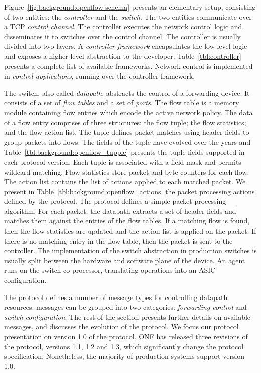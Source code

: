 Figure~\ref{fig:background:openflow-schema} presents an elementary \of setup,
consisting of two entities: the \textit{controller} and the \textit{switch}.
The two entities communicate over a TCP \textit{control channel}.  The \of
controller executes the network control logic and disseminates it to switches
over the control channel. The controller is usually divided into two layers. A
\textit{controller framework} encapsulates the low level \of logic and exposes
a higher level abstraction to the developer.  Table~\ref{tbl:controller}
presents a complete list of available \of frameworks.  Network control is
implemented in \textit{control applications}, running over the controller
framework. 


The \of switch, also called \textit{datapath}, abstracts the control of a
forwarding device. It consists of a set of \textit{flow tables}
and a set of \textit{ports}. The flow table is a memory module containing flow
entries which encode the active network policy. The data of a flow entry comprises of
three structures: the flow tuple; the flow statistics; and the flow
action list.  The tuple defines packet matches using header fields to group packets into
flows.  The fields of the tuple have evolved over the years and
Table~\ref{tbl:background:openflow_tupple} presents the tuple fields
supported in each protocol version. Each tuple is associated with a field mask and permits
wildcard matching.  Flow statistics store packet and byte counters for each
flow. The action list contains the list of actions applied to each matched
packet.  We present in Table~\ref{tbl:background:openflow_actions} the packet
processing actions defined by the \of protocol.  The protocol defines a simple
packet processing algorithm.  For each packet, the datapath extracts a set
of header fields and matches them against the entries of the flow tables.  If a
matching flow is found, then the flow statistics are updated and the action list
is applied on the packet. If there is no matching entry in the flow table, then
the packet is sent to the controller. The implementation of the \of switch
abstraction in production switches is usually split between the hardware and
software plane of the device. An \of agent runs on the switch co-processor,
translating \of operations into an ASIC configuration.  

The protocol defines a number of message types for controlling datapath resources.
\of messages can be grouped into two categories: \emph{forwarding control} and
\emph{switch configuration}. The rest of the section presents further details on
available \of messages, and discusses the evolution of the protocol.  We focus
our protocol presentation on version 1.0 of the protocol.  ONF has released
three revisions of the protocol, versions 1.1, 1.2 and 1.3, which
significantly change the protocol specification. Nonetheless, the majority of
production systems support version 1.0.

